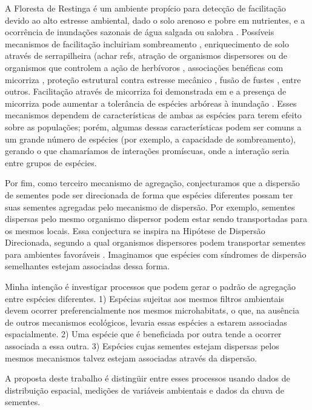 \documentclass[twoside,12pt,a4paper]{report}
\begin{document}
A Floresta de Restinga é um ambiente propício para detecção de facilitação devido ao alto estresse
ambiental, dado o solo arenoso e pobre em nutrientes, e a ocorrência de inundações sazonais de água
salgada ou salobra \citep{TODO refs}. Possíveis mecanismos de facilitação incluiriam sombreamento
\citep{Castanho2014, etc}, enriquecimento de solo através de serrapilheira (achar refs, atração de
organismos dispersores \citep{achar refs CallawayBook} ou de organismos que controlem a ação de
herbívoros \citep{refs}, associações benéficas com micorriza \citep{Simard1997}, proteção
estrutural contra estresse mecânico \citep{refs}, fusão de fustes \citep{McIntire2011}, entre
outros. Facilitação através de micorriza foi demonstrada em \citep{Simard1997} e a presença de
micorriza pode aumentar a tolerância de espécies arbóreas à inundação \citep{Fougnies2007}. Esses
mecanismos dependem de características de ambas as espécies para terem efeito sobre as populações;
porém, algumas dessas características podem ser comuns a um grande número de espécies (por exemplo,
a capacidade de sombreamento), gerando o que chamaríamos de interações promíscuas, onde a interação
seria entre grupos de espécies.

Por fim, como terceiro mecanismo de agregação, conjecturamos que a dispersão de sementes pode ser
direcionada de forma que espécies diferentes possam ter suas sementes agregadas pelo mecanismo de
dispersão. Por exemplo, sementes dispersas pelo mesmo organismo dispersor podem estar sendo
transportadas para os mesmos locais. Essa conjectura se inspira na Hipótese de Dispersão
Direcionada, segundo a qual organismos dispersores podem transportar sementes para ambientes
favoráveis \citep{Wenny2001, TODO,morerefs}. Imaginamos que espécies com síndromes de dispersão
semelhantes estejam associadas dessa forma.

Minha intenção é investigar processos que podem gerar o padrão de agregação entre espécies
diferentes. 1) Espécias sujeitas aos mesmos filtros ambientais devem ocorrer preferencialmente
nos mesmos microhabitats, o que, na ausência de outros mecanismos ecológicos, levaria essas
espécies a estarem associadas espacialmente. 2) Uma espécie que é beneficiada por outra tende a
ocorrer associada a essa outra. 3) Espécies cujas sementes estejam dispersas pelos mesmos
mecanismos talvez estejam associadas através da dispersão.

A proposta deste trabalho é distingüir entre esses processos usando dados de distribuição espacial, medições de variáveis ambientais e dados da chuva de sementes.
\end{document}

